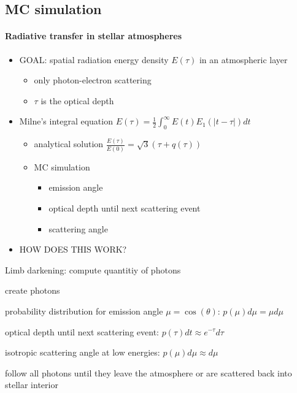 \documentclass[../main/main.tex]{subfiles}
\begin{document}
\subsection{MC simulation}
\paragraph{Radiative transfer in stellar atmospheres}
\begin{itemize}
\item GOAL: spatial radiation energy density $E(\tau)$ in an atmospheric layer 
\begin{itemize}
\item only photon-electron scattering
\item $\tau$ is the optical depth
\end{itemize}

\item Milne's integral equation $\boxed{E(\tau) = \frac{1}{2} \int_0^{\infty} E(t) E_1(|t-\tau|) dt}$
\begin{itemize}
\item analytical solution $\frac{E(\tau)}{E(0)} = \sqrt{3} (\tau + q(\tau))$
\item MC simulation
\begin{itemize}
\item emission angle
\item optical depth until next scattering event
\item scattering angle
\end{itemize}
\end{itemize}

\item HOW DOES THIS WORK?
\end{itemize}

\begin{algorithm}
\caption{Limb darkening: compute quantitiy of photons}\label{limb_darkening}
\begin{algorithmic}
\State create photons

\State probability distribution for emission angle $\mu = \cos(\theta)$: $\boxed{p(\mu) d \mu = \mu d \mu}$

\State optical depth until next scattering event: $\boxed{p(\tau)dt \approx e^{-\tau} d\tau}$

\State isotropic scattering angle at low energies: $\boxed{p(\mu) d\mu \approx d\mu}$

\State follow all photons until they leave the atmosphere or are scattered back into stellar interior
\end{algorithmic}
\end{algorithm}
\end{document}
